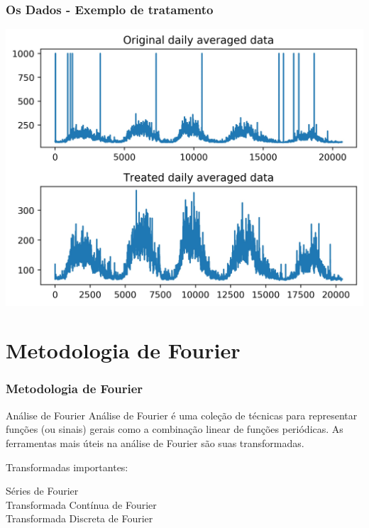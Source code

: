 \documentclass{beamer}
\begin{document}
\begin{frame}
\frametitle{Os Dados - Exemplo de tratamento}
\begin{center}
\includegraphics[scale=0.55]{Figuras/final_2.jpg}
\end{center}
\end{frame}

\section{Metodologia de Fourier}

\begin{frame}
\frametitle{Metodologia de Fourier}
\begin{block}{Análise de Fourier}
Análise de Fourier é uma coleção de técnicas para representar funções (ou sinais) gerais como a combinação linear de funções periódicas. As ferramentas mais úteis na análise de Fourier são suas transformadas.
\end{block}
Transformadas importantes:
\begin{description}
\item[Séries de Fourier] 
\item[Transformada Contínua de Fourier] 
\item[Transformada Discreta de Fourier] 
\end{description}
\end{frame}
\end{document}

